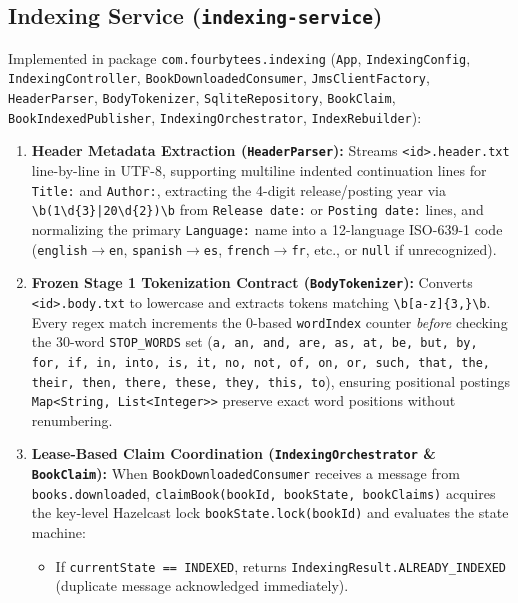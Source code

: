 \documentclass[10pt,a4paper]{article}
\begin{document}
\subsection{Indexing Service (\texttt{indexing-service})}
Implemented in package \texttt{com.fourbytees.indexing} (\texttt{App}, \texttt{IndexingConfig}, \texttt{IndexingController}, \texttt{BookDownloadedConsumer}, \texttt{JmsClientFactory}, \texttt{HeaderParser}, \texttt{BodyTokenizer}, \texttt{SqliteRepository}, \texttt{BookClaim}, \texttt{BookIndexedPublisher}, \texttt{IndexingOrchestrator}, \texttt{IndexRebuilder}):
\begin{enumerate}[leftmargin=*,nosep]
    \item \textbf{Header Metadata Extraction (\texttt{HeaderParser}):} Streams \texttt{<id>.header.txt} line-by-line in UTF-8, supporting multiline indented continuation lines for \texttt{Title:} and \texttt{Author:}, extracting the 4-digit release/posting year via \texttt{\textbackslash b(1\textbackslash d\{3\}|20\textbackslash d\{2\})\textbackslash b} from \texttt{Release date:} or \texttt{Posting date:} lines, and normalizing the primary \texttt{Language:} name into a 12-language ISO-639-1 code (\texttt{english}$\to$\texttt{en}, \texttt{spanish}$\to$\texttt{es}, \texttt{french}$\to$\texttt{fr}, etc., or \texttt{null} if unrecognized).
    \item \textbf{Frozen Stage 1 Tokenization Contract (\texttt{BodyTokenizer}):} Converts \texttt{<id>.body.txt} to lowercase and extracts tokens matching \texttt{\textbackslash b[a-z]\{3,\}\textbackslash b}. Every regex match increments the 0-based \texttt{wordIndex} counter \emph{before} checking the 30-word \texttt{STOP\_WORDS} set (\texttt{a, an, and, are, as, at, be, but, by, for, if, in, into, is, it, no, not, of, on, or, such, that, the, their, then, there, these, they, this, to}), ensuring positional postings \texttt{Map<String, List<Integer>>} preserve exact word positions without renumbering.
    \item \textbf{Lease-Based Claim Coordination (\texttt{IndexingOrchestrator} \& \texttt{BookClaim}):} When \texttt{BookDownloadedConsumer} receives a message from \texttt{books.downloaded}, \texttt{claimBook(bookId, bookState, bookClaims)} acquires the key-level Hazelcast lock \texttt{bookState.lock(bookId)} and evaluates the state machine:
    \begin{itemize}[nosep]
        \item If \texttt{currentState == INDEXED}, returns \texttt{IndexingResult.ALREADY\_INDEXED} (duplicate message acknowledged immediately).

\end{itemize}
\end{enumerate}
\end{document}
